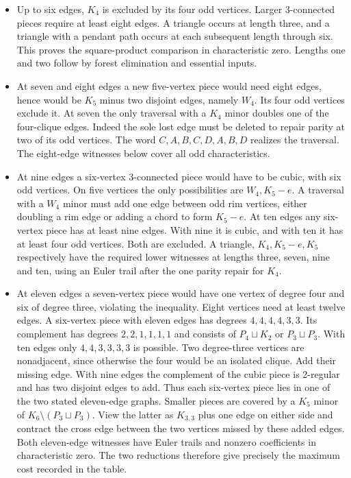\documentclass[11pt,letterpaper]{article}
\providecommand{\tightlist}{\setlength{\itemsep}{0pt}\setlength{\parskip}{0pt}}
\begin{document}
\begin{itemize}
\tightlist
\item
  Up to six edges, \(K_4\) is excluded by its four odd vertices. Larger 3-connected pieces require at least eight edges. A triangle occurs at length three, and a triangle with a pendant path occurs at each subsequent length through six. This proves the square-product comparison in characteristic zero. Lengths one and two follow by forest elimination and essential inputs.
\item
  At seven and eight edges a new five-vertex piece would need eight edges, hence would be \(K_5\) minus two disjoint edges, namely \(W_4\). Its four odd vertices exclude it. At seven the only traversal with a \(K_4\) minor doubles one of the four-clique edges. Indeed the sole lost edge must be deleted to repair parity at two of its odd vertices. The word \(C,A,B,C,D,A,B,D\) realizes the traversal. The eight-edge witnesses below cover all odd characteristics.
\item
  At nine edges a six-vertex 3-connected piece would have to be cubic, with six odd vertices. On five vertices the only possibilities are \(W_4,K_5-e\). A traversal with a \(W_4\) minor must add one edge between odd rim vertices, either doubling a rim edge or adding a chord to form \(K_5-e\). At ten edges any six-vertex piece has at least nine edges. With nine it is cubic, and with ten it has at least four odd vertices. Both are excluded. A triangle, \(K_4,K_5-e,K_5\) respectively have the required lower witnesses at lengths three, seven, nine and ten, using an Euler trail after the one parity repair for \(K_4\).
\item
  At eleven edges a seven-vertex piece would have one vertex of degree four and six of degree three, violating the inequality. Eight vertices need at least twelve edges. A six-vertex piece with eleven edges has degrees \(4,4,4,4,3,3\). Its complement has degrees \(2,2,1,1,1,1\) and consists of \(P_4\sqcup K_2\) or \(P_3\sqcup P_3\). With ten edges only \(4,4,3,3,3,3\) is possible. Two degree-three vertices are nonadjacent, since otherwise the four would be an isolated clique. Add their missing edge. With nine edges the complement of the cubic piece is 2-regular and has two disjoint edges to add. Thus each six-vertex piece lies in one of the two stated eleven-edge graphs. Smaller pieces are covered by a \(K_5\) minor of \(K_6\setminus(P_3\sqcup P_3)\). View the latter as \(K_{3,3}\) plus one edge on either side and contract the cross edge between the two vertices missed by these added edges. Both eleven-edge witnesses have Euler trails and nonzero coefficients in characteristic zero. The two reductions therefore give precisely the maximum cost recorded in the table.
\end{itemize}
\end{document}
